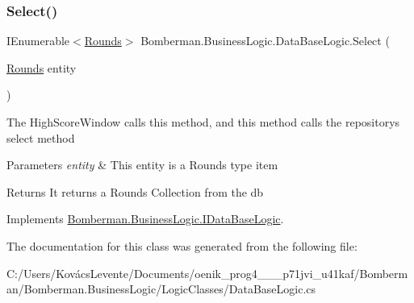 \subsubsection{\texorpdfstring{Select()}{Select()}}
{\footnotesize\ttfamily I\+Enumerable$<$\mbox{\hyperlink{class_bomberman_1_1_data_1_1_rounds}{Rounds}}$>$ Bomberman.\+Business\+Logic.\+Data\+Base\+Logic.\+Select (\begin{DoxyParamCaption}\item[{\mbox{\hyperlink{class_bomberman_1_1_data_1_1_rounds}{Rounds}}}]{entity }\end{DoxyParamCaption})\hspace{0.3cm}{\ttfamily [inline]}}



The High\+Score\+Window calls this method, and this method calls the repository\textquotesingle{}s select method 


\begin{DoxyParams}{Parameters}
{\em entity} & This entity is a Rounds type item \\
\hline
\end{DoxyParams}
\begin{DoxyReturn}{Returns}
It returns a Rounds Collection from the db
\end{DoxyReturn}


Implements \mbox{\hyperlink{interface_bomberman_1_1_business_logic_1_1_i_data_base_logic_aaa56c20c9b41d5f4a3c2522f450ecb41}{Bomberman.\+Business\+Logic.\+I\+Data\+Base\+Logic}}.



The documentation for this class was generated from the following file\+:\begin{DoxyCompactItemize}
\item 
C\+:/\+Users/\+Kovács\+Levente/\+Documents/oenik\+\_\+prog4\+\_\+\_\+\_\+p71jvi\+\_\+u41kaf/\+Bomberman/\+Bomberman.\+Business\+Logic/\+Logic\+Classes/Data\+Base\+Logic.\+cs\end{DoxyCompactItemize}
